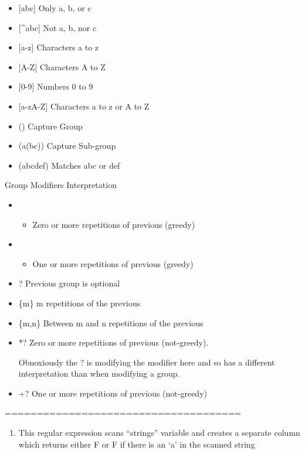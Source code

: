 \documentclass[
]{article}
\providecommand{\tightlist}{%
  \setlength{\itemsep}{0pt}\setlength{\parskip}{0pt}}
\begin{document}
\begin{itemize}
\item
  {[}abc{]} Only a, b, or c
\item
  {[}\^{}abc{]} Not a, b, nor c
\item
  {[}a-z{]} Characters a to z
\item
  {[}A-Z{]} Characters A to Z
\item
  {[}0-9{]} Numbers 0 to 9
\item
  {[}a-zA-Z{]} Characters a to z or A to Z
\item
  () Capture Group
\item
  (a(bc)) Capture Sub-group
\item
  (abc\textbar def) Matches abc or def
\end{itemize}

Group Modifiers Interpretation

\begin{itemize}
\item
  \begin{itemize}
  \tightlist
  \item
    Zero or more repetitions of previous (greedy)
  \end{itemize}
\item
  \begin{itemize}
  \tightlist
  \item
    One or more repetitions of previous (greedy)
  \end{itemize}
\item
  ? Previous group is optional
\item
  \{m\} m repetitions of the previous
\item
  \{m,n\} Between m and n repetitions of the previous
\item
  *? Zero or more repetitions of previous (not-greedy).

  Obnoxiously the ? is modifying the modifier here and so has a
  different interpretation than when modifying a group.
\item
  +? One or more repetitions of previous (not-greedy)
\end{itemize}

=====================================

\begin{enumerate}
\def\labelenumi{\alph{enumi})}
\tightlist
\item
  This regular expression scans ``strings'' variable and creates a
  separate column which returns either F or F if there is an `a' in the
  scanned string
\end{enumerate}
\end{document}
